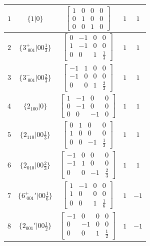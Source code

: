 \documentclass[fleqn,8pt]{jsarticle}
\begin{document}
\begin{longtable}{ccccc}
$ 1 $ & $ \{1|0\} $ & $ \begin{bmatrix} 1 & 0 & 0 & 0 \\ 0 & 1 & 0 & 0 \\ 0 & 0 & 1 & 0 \end{bmatrix} $ & $ 1 $ & $ 1 $ \\ \hline
$ 2 $ & $ \{3^{+}_{\,\,001}|0 0 \frac{1}{3}\} $ & $ \begin{bmatrix} 0 & -1 & 0 & 0 \\ 1 & -1 & 0 & 0 \\ 0 & 0 & 1 & \frac{1}{3} \end{bmatrix} $ & $ 1 $ & $ 1 $ \\ \hline
$ 3 $ & $ \{3^{-}_{\,\,001}|0 0 \frac{2}{3}\} $ & $ \begin{bmatrix} -1 & 1 & 0 & 0 \\ -1 & 0 & 0 & 0 \\ 0 & 0 & 1 & \frac{2}{3} \end{bmatrix} $ & $ 1 $ & $ 1 $ \\ \hline
$ 4 $ & $ \{2{}_{100}|0\} $ & $ \begin{bmatrix} 1 & -1 & 0 & 0 \\ 0 & -1 & 0 & 0 \\ 0 & 0 & -1 & 0 \end{bmatrix} $ & $ 1 $ & $ 1 $ \\ \hline
$ 5 $ & $ \{2{}_{110}|0 0 \frac{1}{3}\} $ & $ \begin{bmatrix} 0 & 1 & 0 & 0 \\ 1 & 0 & 0 & 0 \\ 0 & 0 & -1 & \frac{1}{3} \end{bmatrix} $ & $ 1 $ & $ 1 $ \\ \hline
$ 6 $ & $ \{2{}_{010}|0 0 \frac{2}{3}\} $ & $ \begin{bmatrix} -1 & 0 & 0 & 0 \\ -1 & 1 & 0 & 0 \\ 0 & 0 & -1 & \frac{2}{3} \end{bmatrix} $ & $ 1 $ & $ 1 $ \\ \hline
$ 7 $ & $ \{6^{+}_{\,\,001}{}'|0 0 \frac{1}{6}\} $ & $ \begin{bmatrix} 1 & -1 & 0 & 0 \\ 1 & 0 & 0 & 0 \\ 0 & 0 & 1 & \frac{1}{6} \end{bmatrix} $ & $ 1 $ & $ -1 $ \\ \hline
$ 8 $ & $ \{2{}_{001}{}'|0 0 \frac{1}{2}\} $ & $ \begin{bmatrix} -1 & 0 & 0 & 0 \\ 0 & -1 & 0 & 0 \\ 0 & 0 & 1 & \frac{1}{2} \end{bmatrix} $ & $ 1 $ & $ -1 $ \\ \hline

\end{longtable}
\end{document}
